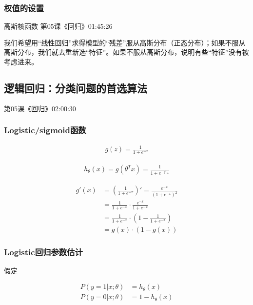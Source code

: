\documentclass[UTF8]{ctexart}
\begin{document}
\subsubsection{权值的设置}

高斯核函数 第05课《回归》01:45:26

我们希望用“线性回归”求得模型的“残差”服从高斯分布（正态分布）；如果不服从高斯分布，我们就去重新选“特征”。如果不服从高斯分布，说明有些“特征”没有被考虑进来。


\subsection{逻辑回归：分类问题的首选算法}

第05课《回归》02:00:30

\subsubsection{Logistic/sigmoid函数}


 \begin{equation}
\begin{aligned}
g(z)=\frac{1}{1+e^{-z}}
\end{aligned}
\end{equation}

 \begin{equation}
\begin{aligned}
h_{\theta}(x)=g(\theta^{T}x)=\frac{1}{1+e^{-\theta^{T}x}}
\end{aligned}
\end{equation}

 \begin{equation}
\begin{aligned}
g'(x)&=(\frac{1}{1+e^{-x}})'=\frac{e^{-x}}{(1+e^{-x})^{2}}\\
&=\frac{1}{1+e^{-x}} \cdot \frac{e^{-x}}{1+e^{-x}}\\
&=\frac{1}{1+e^{-x}} \cdot (1- \frac{1}{1+e^{-x}})\\
&=g(x) \cdot (1-g(x))
\end{aligned}
\end{equation}

\subsubsection{Logistic回归参数估计}

假定

 \begin{equation}
\begin{aligned}
P(y=1|x;\theta)&=h_{\theta}(x)\\
P(y=0|x;\theta)&=1-h_{\theta}(x)\\
\end{aligned}
\end{equation}
\end{document}
